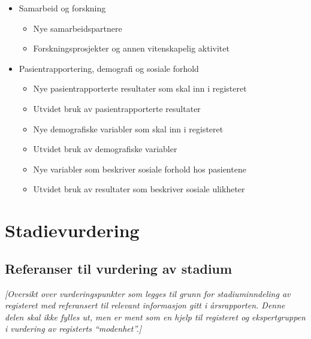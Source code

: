 \documentclass[norsk, a4paper, twocolumn]{report}
\newcommand{\guide}[1] {
	\textit{[\textcolor{guidegray}{#1}]}
	}
\begin{document}
\begin{itemize}
  \item Samarbeid og forskning
    \begin{itemize}
      \item Nye samarbeidspartnere
      \item Forskningsprosjekter og annen vitenskapelig aktivitet
    \end{itemize}
  \item Pasientrapportering, demografi og sosiale forhold
    \begin{itemize}
      \item Nye pasientrapporterte resultater som skal inn i registeret
      \item Utvidet bruk av pasientrapporterte resultater
      \item Nye demografiske variabler som skal inn i registeret
      \item Utvidet bruk av demografiske variabler
      \item Nye variabler som beskriver sosiale forhold hos pasientene
      \item Utvidet bruk av resultater som beskriver sosiale ulikheter
    \end{itemize}
\end{itemize}






\part{Stadievurdering}
\chapter{Referanser til vurdering av stadium}
\guide{Oversikt over vurderingspunkter som legges til grunn for
stadiuminndeling av registeret med referansert til relevant informasjon
gitt i årsrapporten. Denne delen skal ikke fylles ut, men er ment som en
hjelp til registeret og ekspertgruppen i vurdering av registerts
``modenhet''.}
\end{document}
